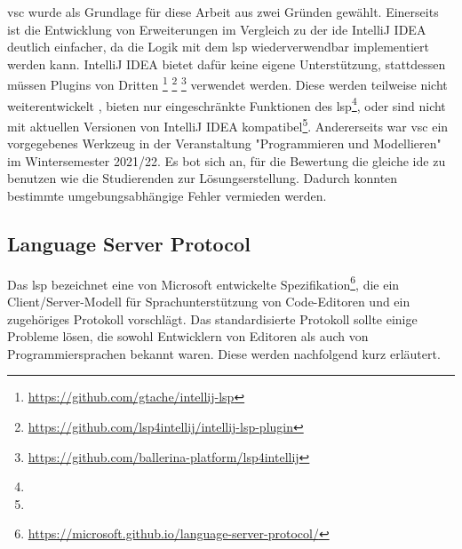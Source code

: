 \ac{vsc} wurde als Grundlage für diese Arbeit aus zwei Gründen gewählt.
Einerseits ist die Entwicklung von Erweiterungen im Vergleich zu der \ac{ide} IntelliJ IDEA deutlich einfacher, da die Logik mit dem \ac{lsp} wiederverwendbar implementiert werden kann.
IntelliJ IDEA bietet dafür keine eigene Unterstützung, stattdessen müssen Plugins von Dritten
\footnote{\url{https://github.com/gtache/intellij-lsp}\label{fn:intellij-lsp}}
\footnote{\url{https://github.com/lsp4intellij/intellij-lsp-plugin}\label{fn:intellij-lsp-plugin}}
\footnote{\url{https://github.com/ballerina-platform/lsp4intellij}\label{fn:lsp4intellij}}
verwendet werden.
Diese werden teilweise nicht weiterentwickelt , bieten nur eingeschränkte Funktionen des \ac{lsp}\footnote{}, oder sind nicht mit aktuellen Versionen von IntelliJ IDEA kompatibel\footnote{}.
Andererseits war \ac{vsc} ein vorgegebenes Werkzeug in der Veranstaltung "Programmieren und Modellieren" im Wintersemester 2021/22.
Es bot sich an, für die Bewertung die gleiche \ac{ide} zu benutzen wie die Studierenden zur Lösungserstellung.
Dadurch konnten bestimmte umgebungsabhängige Fehler vermieden werden.

\subsection{Language Server Protocol}\label{subsec:language-server-protocol}

Das \ac{lsp} bezeichnet eine von Microsoft entwickelte Spezifikation\footnote{\url{https://microsoft.github.io/language-server-protocol/}}, die ein Client/Server-Modell für Sprachunterstützung von Code-Editoren und ein zugehöriges Protokoll vorschlägt.
Das standardisierte Protokoll sollte einige Probleme lösen, die sowohl Entwicklern von Editoren als auch von Programmiersprachen bekannt waren.
Diese werden nachfolgend kurz erläutert.

